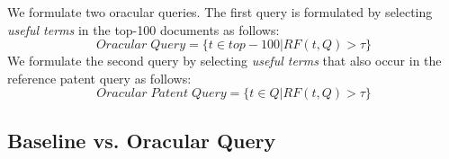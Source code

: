 
%

We formulate two oracular queries. The first query is formulated by selecting \emph{useful terms} in the top-100 documents as follows: 
\begin{equation}
Oracular \; Query = \{t \in top-100|RF(t, Q)>\tau\}   
 \label{eq:score}
\end{equation}
We formulate the second query by selecting \textit{useful terms} that also occur in the reference patent query as follows:
\begin{equation}
 Oracular \; Patent \; Query = \{t\in Q|RF(t, Q)>\tau\}   
 \label{eq:score}
\end{equation}

\subsection{Baseline vs. Oracular Query}

